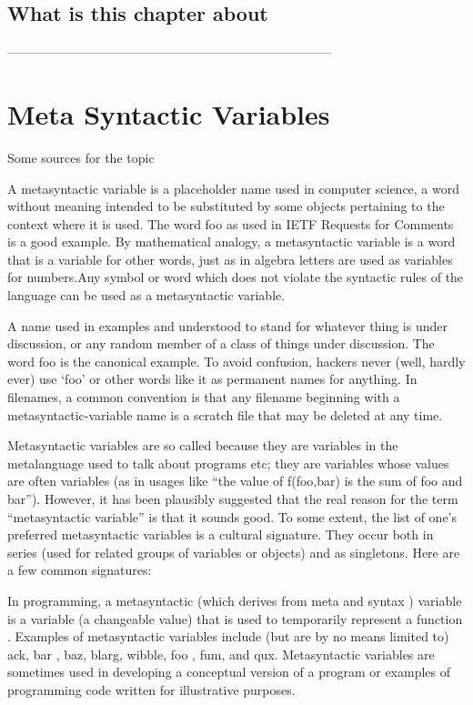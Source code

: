 \documentclass[thesis-solanki.tex]{subfiles}
\begin{document}
\section{What is this chapter about}

-----------------------------------------------------------------------------


\chapter{Meta Syntactic Variables}\label{chap:metasyntacticvariables}

Some sources for the topic 


\cite{website:metasyntacticvariableswiki}
A metasyntactic variable is a placeholder name used in computer science, a word without meaning intended to be substituted by some objects pertaining to the context where it is used. The word foo as used in IETF Requests for Comments is a good example.
By mathematical analogy, a metasyntactic variable is a word that is a variable for other words, just as in algebra letters are used as variables for numbers.Any symbol or word which does not violate the syntactic rules of the language can be used as a metasyntactic variable.




\cite{webiste:metasyntacticvariablescatb}
A name used in examples and understood to stand for whatever thing is under discussion, or any random member of a class of things under discussion. The word foo is the canonical example. To avoid confusion, hackers never (well, hardly ever) use ‘foo’ or other words like it as permanent names for anything. In filenames, a common convention is that any filename beginning with a metasyntactic-variable name is a scratch file that may be deleted at any time.

Metasyntactic variables are so called because they are variables in the metalanguage used to talk about programs etc; they are variables whose values are often variables (as in usages like “the value of f(foo,bar) is the sum of foo and bar”). However, it has been plausibly suggested that the real reason for the term “metasyntactic variable” is that it sounds good. To some extent, the list of one's preferred metasyntactic variables is a cultural signature. They occur both in series (used for related groups of variables or objects) and as singletons. Here are a few common signatures:


\cite{webiste:metasyntacticvariableswhatistectarget}
In programming, a metasyntactic (which derives from meta and syntax ) variable is a variable (a changeable value) that is used to temporarily represent a function . Examples of metasyntactic variables include (but are by no means limited to) ack, bar , baz, blarg, wibble, foo , fum, and qux. Metasyntactic variables are sometimes used in developing a conceptual version of a program or examples of programming code written for illustrative purposes.
\end{document}
